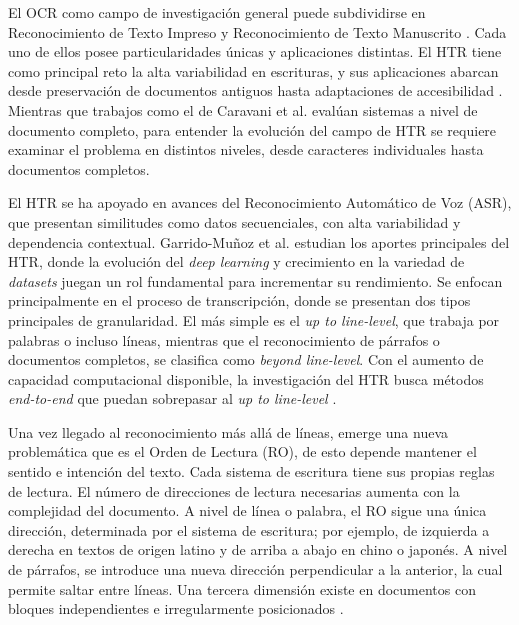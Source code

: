 \documentclass[conference]{IEEEtran}
\begin{document}
El OCR como campo de investigación general puede subdividirse en Reconocimiento de Texto Impreso y Reconocimiento de Texto Manuscrito \cite{caravani_assessing_2027}. Cada uno de ellos posee particularidades únicas y aplicaciones distintas. El HTR tiene como principal reto la alta variabilidad en escrituras, y sus aplicaciones abarcan desde preservación de documentos antiguos hasta adaptaciones de accesibilidad \cite{garrido-munoz_handwritten_2026}. Mientras que trabajos como el de Caravani et al. \cite{caravani_assessing_2027} evalúan sistemas a nivel de documento completo, para entender la evolución del campo de HTR se requiere examinar el problema en distintos niveles, desde  caracteres individuales hasta documentos completos.

El HTR se ha apoyado en avances del Reconocimiento Automático de Voz (ASR), que presentan similitudes como datos secuenciales, con alta variabilidad y dependencia contextual.  Garrido-Muñoz et al. \cite{garrido-munoz_handwritten_2026} estudian los aportes principales del HTR, donde la evolución del \textit{deep learning} y crecimiento en la variedad de \textit{datasets} juegan un rol fundamental para incrementar su rendimiento. Se enfocan principalmente en el proceso de transcripción, donde se presentan dos tipos principales de granularidad. El más simple es el \textit{up to line-level}, que trabaja por palabras o incluso líneas, mientras que el reconocimiento de párrafos o documentos completos, se clasifica como \textit{beyond line-level}. Con el aumento de capacidad computacional disponible, la investigación del HTR busca métodos \textit{end-to-end} que puedan sobrepasar al \textit{up to line-level} \cite{garrido-munoz_handwritten_2026}.

Una vez llegado al reconocimiento más allá de líneas, emerge una nueva problemática que es el Orden de Lectura (RO), de esto depende mantener el sentido e intención del texto. Cada sistema de escritura tiene sus propias reglas de lectura. El número de direcciones de lectura necesarias aumenta con la complejidad del documento. A nivel de línea o palabra, el RO sigue una única dirección, determinada por el sistema de escritura; por ejemplo, de izquierda a derecha en textos de origen latino y de arriba a abajo en chino o japonés. A nivel de párrafos, se introduce una nueva dirección perpendicular a la anterior, la cual permite saltar entre líneas. Una tercera dimensión existe en documentos con bloques independientes e irregularmente posicionados \cite{garrido-munoz_handwritten_2026}.
\end{document}
